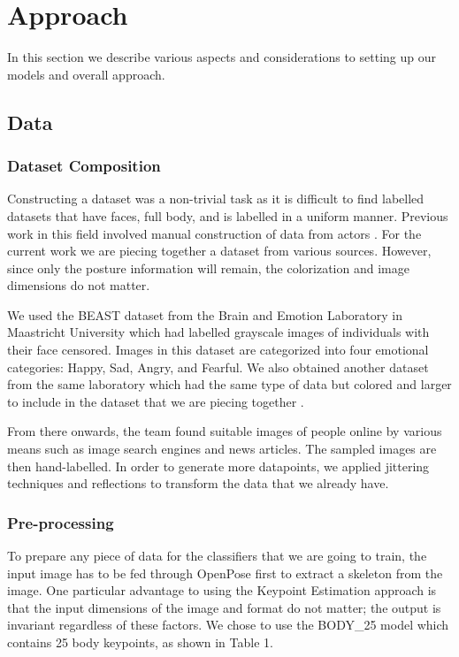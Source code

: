 \documentclass{article}
\begin{document}
\section{Approach}

In this section we describe various aspects and considerations to setting up our models and overall approach.

\subsection{Data}

\subsubsection{Dataset Composition}
Constructing a dataset was a non-trivial task as it is difficult to find labelled datasets that have faces, full body, and is labelled in a uniform manner. Previous work in this field involved manual construction of data from actors \citep{schindler2008recognizing}. For the current work we are piecing together a dataset from various sources. However, since only the posture information will remain, the colorization and image dimensions do not matter.

We used the BEAST dataset \citep{de2011bodily} from the Brain and Emotion Laboratory in Maastricht University which had labelled grayscale images of individuals with their face censored. Images in this dataset are categorized into four emotional categories: Happy, Sad, Angry, and Fearful. We also obtained another dataset from the same laboratory which had the same type of data but colored and larger to include in the dataset that we are piecing together \citep{stienen2012computational}.

From there onwards, the team found suitable images of people online by various means such as image search engines and news articles. The sampled images are then hand-labelled. In order to generate more datapoints, we applied jittering techniques and reflections to transform the data that we already have.

\subsubsection{Pre-processing}

To prepare any piece of data for the classifiers that we are going to train, the input image has to be fed through OpenPose first to extract a skeleton from the image. One particular advantage to using the Keypoint Estimation approach is that the input dimensions of the image and format do not matter; the output is invariant regardless of these factors. We chose to use the BODY\_25 model which contains 25 body keypoints, as shown in Table 1.
\end{document}
